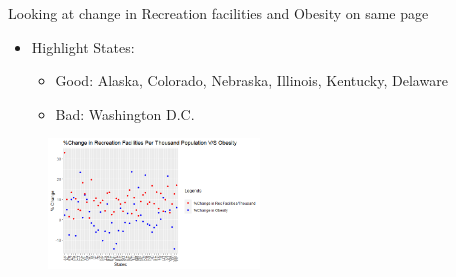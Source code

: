 \documentclass{beamer} %
\begin{document}
\begin{frame}{Looking at change in Recreation facilities and Obesity on same page}
  \begin{itemize}
   \item Highlight States:
   \begin{itemize}
    \item Good: Alaska, Colorado, Nebraska, Illinois, Kentucky, Delaware
    \item Bad: Washington D.C.
   \end {itemize}
  \end{itemize}
 \begin{figure}
   \includegraphics[width=0.5\textwidth]{ObesityRecPTH.png}
   \hfill
 \end{figure}
\end{frame}
\end{document}
